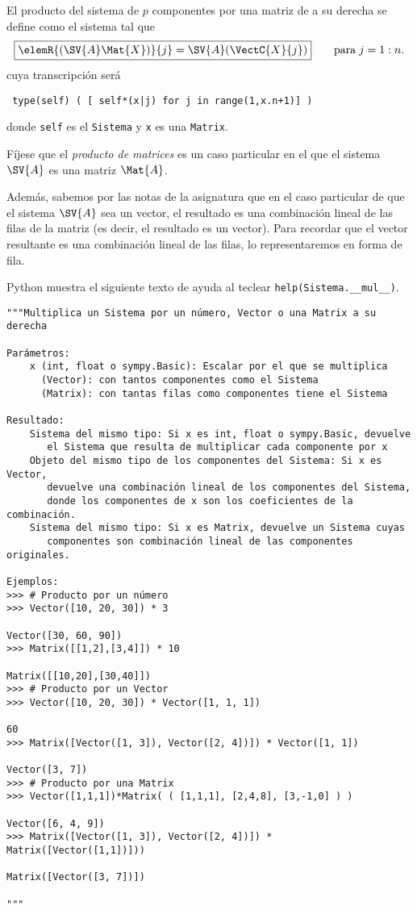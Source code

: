 \documentclass[11pt]{report}
\begin{document}
El producto del sistema  de \(p\) componentes por una matriz
 de \R[n] a su derecha se define como el sistema tal
que
\begin{displaymath}
  \fbox{$\elemR{(\SV{A}\Mat{X})}{j}=\SV{A}(\VectC{X}{j})$}
  \qquad\text{para}\; j=1:n.
\end{displaymath}
cuya transcripción será
\begin{center}
  \Verb/ type(self) ( [ self*(x|j) for j in range(1,x.n+1)] ) /
\end{center}
donde \texttt{self} es el \texttt{Sistema} y \texttt{x} es una \texttt{Matrix}.

Fíjese que el \emph{producto de matrices} es un caso particular en el que
el sistema \(\SV{A}\) es una matriz \(\Mat{A}\).

Además, sabemos por las notas de la asignatura que en el caso
particular de que el sistema \(\SV{A}\) sea un vector, el resultado es
una combinación lineal de las filas de la matriz  (es decir, el
resultado es un vector). Para recordar que el vector resultante es una
combinación lineal de las filas, lo representaremos en forma de fila.

Python muestra el siguiente texto de ayuda al teclear
\texttt{help(Sistema.\_\_mul\_\_)}.
\begin{verbatim}
"""Multiplica un Sistema por un número, Vector o una Matrix a su derecha

Parámetros:
    x (int, float o sympy.Basic): Escalar por el que se multiplica
      (Vector): con tantos componentes como el Sistema
      (Matrix): con tantas filas como componentes tiene el Sistema

Resultado:
    Sistema del mismo tipo: Si x es int, float o sympy.Basic, devuelve 
       el Sistema que resulta de multiplicar cada componente por x
    Objeto del mismo tipo de los componentes del Sistema: Si x es Vector,
       devuelve una combinación lineal de los componentes del Sistema, 
       donde los componentes de x son los coeficientes de la combinación.
    Sistema del mismo tipo: Si x es Matrix, devuelve un Sistema cuyas 
       componentes son combinación lineal de las componentes originales.
       
Ejemplos:
>>> # Producto por un número
>>> Vector([10, 20, 30]) * 3

Vector([30, 60, 90])
>>> Matrix([[1,2],[3,4]]) * 10

Matrix([[10,20],[30,40]])
>>> # Producto por un Vector
>>> Vector([10, 20, 30]) * Vector([1, 1, 1])

60
>>> Matrix([Vector([1, 3]), Vector([2, 4])]) * Vector([1, 1])

Vector([3, 7])
>>> # Producto por una Matrix
>>> Vector([1,1,1])*Matrix( ( [1,1,1], [2,4,8], [3,-1,0] ) )

Vector([6, 4, 9])
>>> Matrix([Vector([1, 3]), Vector([2, 4])]) * Matrix([Vector([1,1])]))

Matrix([Vector([3, 7])])

"""
\end{verbatim}
\end{document}
